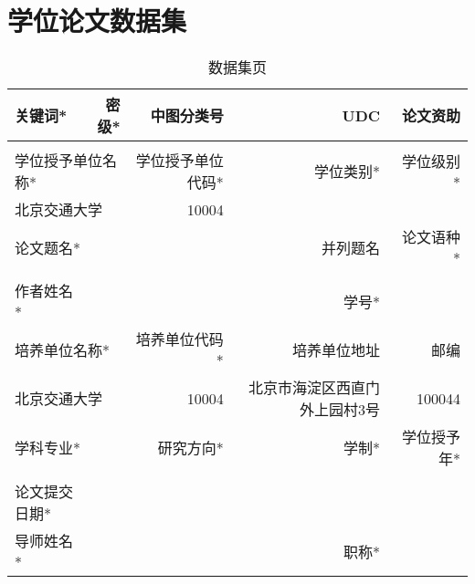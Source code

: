 \chapter*{学位论文数据集}
\begin{table}[htbp]
	\centering
	\caption{数据集页}
	\begin{tabular}{|p{6.94em}rrrr|}
		\hline
		\multicolumn{1}{|p{6.94em}|}{关键词*} & \multicolumn{1}{p{6.065em}|}{密级*} & \multicolumn{1}{p{6.625em}|}{中图分类号} & \multicolumn{1}{p{7em}|}{UDC} & \multicolumn{1}{p{6.69em}|}{论文资助} \\
		\hline
		\multicolumn{1}{|r|}{} & \multicolumn{1}{r|}{} & \multicolumn{1}{r|}{} & \multicolumn{1}{r|}{} &  \\
		\hline
		\multicolumn{2}{|p{13.005em}|}{学位授予单位名称*} & \multicolumn{1}{p{6.625em}|}{学位授予单位代码*} & \multicolumn{1}{p{7em}|}{学位类别*} & \multicolumn{1}{p{6.69em}|}{学位级别*} \\
		\hline
		\multicolumn{2}{|p{13.005em}|}{北京交通大学} & \multicolumn{1}{r|}{10004} & \multicolumn{1}{r|}{} &  \\
		\hline
		\multicolumn{2}{|p{13.005em}|}{论文题名*} & \multicolumn{2}{p{13.625em}|}{并列题名} & \multicolumn{1}{p{6.69em}|}{论文语种*} \\
		\hline
		\multicolumn{2}{|r|}{} & \multicolumn{2}{r|}{} &  \\
		\hline
		\multicolumn{1}{|p{6.94em}|}{作者姓名*} & \multicolumn{2}{r|}{} & \multicolumn{1}{p{7em}|}{学号*} &  \\
		\hline
		\multicolumn{2}{|p{13.005em}|}{培养单位名称*} & \multicolumn{1}{p{6.625em}|}{培养单位代码*} & \multicolumn{1}{p{7em}|}{培养单位地址} & \multicolumn{1}{p{6.69em}|}{邮编} \\
		\hline
		\multicolumn{2}{|p{13.005em}|}{北京交通大学} & \multicolumn{1}{r|}{10004} & \multicolumn{1}{p{7em}|}{北京市海淀区西直门外上园村3号} & 100044 \\
		\hline
		\multicolumn{2}{|p{13.005em}|}{学科专业*} & \multicolumn{1}{p{6.625em}|}{研究方向*} & \multicolumn{1}{p{7em}|}{学制*} & \multicolumn{1}{p{6.69em}|}{学位授予年*} \\
		\hline
		\multicolumn{2}{|r|}{} & \multicolumn{1}{r|}{} & \multicolumn{1}{r|}{} &  \\
		\hline
		\multicolumn{1}{|p{6.94em}|}{论文提交日期*} & \multicolumn{4}{r|}{} \\
		\hline
		\multicolumn{1}{|p{6.94em}|}{导师姓名*} & \multicolumn{2}{r|}{} & \multicolumn{1}{p{7em}|}{职称*} &  \\

\end{tabular}
\end{table}
